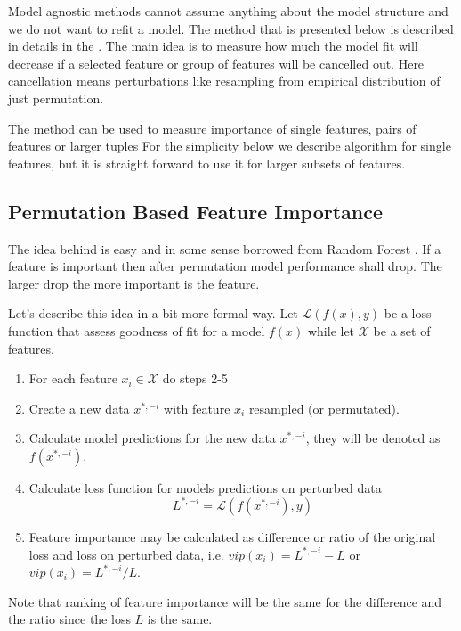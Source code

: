 \documentclass[12pt,]{krantz}
\providecommand{\tightlist}{%
  \setlength{\itemsep}{0pt}\setlength{\parskip}{0pt}}
\theoremstyle{definition}
\theoremstyle{definition}
\theoremstyle{definition}
\theoremstyle{remark}
\begin{document}
Model agnostic methods cannot assume anything about the model structure
and we do not want to refit a model. The method that is presented below
is described in details in the \citep{variableImportancePermutations}.
The main idea is to measure how much the model fit will decrease if a
selected feature or group of features will be cancelled out. Here
cancellation means perturbations like resampling from empirical
distribution of just permutation.

The method can be used to measure importance of single features, pairs
of features or larger tuples For the simplicity below we describe
algorithm for single features, but it is straight forward to use it for
larger subsets of features.

\hypertarget{permutation-based-feature-importance}{%
\subsection{Permutation Based Feature
Importance}\label{permutation-based-feature-importance}}

The idea behind is easy and in some sense borrowed from Random Forest
\citep{R-randomForest}. If a feature is important then after permutation
model performance shall drop. The larger drop the more important is the
feature.

Let's describe this idea in a bit more formal way. Let
\(\mathcal L(f(x), y)\) be a loss function that assess goodness of fit
for a model \(f(x)\) while let \(\mathcal X\) be a set of features.

\begin{enumerate}
\def\labelenumi{\arabic{enumi}.}
\tightlist
\item
  For each feature \(x_i \in \mathcal X\) do steps 2-5
\item
  Create a new data \(x^{*,-i}\) with feature \(x_i\) resampled (or
  permutated).
\item
  Calculate model predictions for the new data \(x^{*,-i}\), they will
  be denoted as \(f(x^{*,-i})\).
\item
  Calculate loss function for models predictions on perturbed data \[
  L^{*,-i} = \mathcal L(f(x^{*,-i}), y)
  \]
\item
  Feature importance may be calculated as difference or ratio of the
  original loss and loss on perturbed data, i.e.
  \(vip(x_i) = L^{*,-i} - L\) or \(vip(x_i) = L^{*,-i} / L\).
\end{enumerate}

Note that ranking of feature importance will be the same for the
difference and the ratio since the loss \(L\) is the same.
\end{document}

